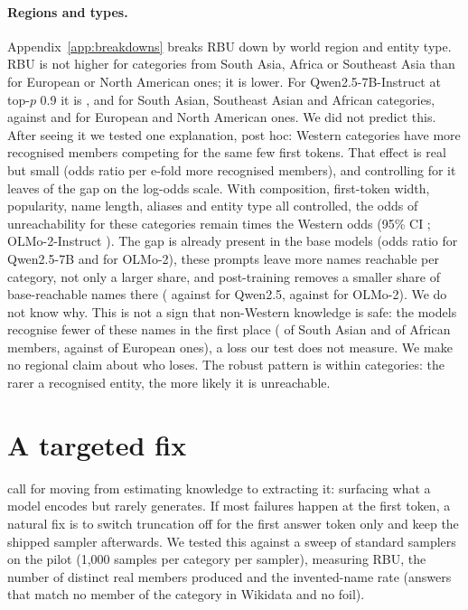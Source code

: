 \documentclass[11pt]{article}
\begin{document}
\paragraph{Regions and types.} Appendix~\ref{app:breakdowns} breaks RBU down by world region and entity type. RBU is not higher for categories from South Asia, Africa or Southeast Asia than for European or North American ones; it is lower. For Qwen2.5-7B-Instruct at top-$p$ 0.9 it is \rgRbuSouthAsia{}, \rgRbuSoutheastAsia{} and \rgRbuAfrica{} for South Asian, Southeast Asian and African categories, against \rgRbuEurope{} and \rgRbuNorthAmerica{} for European and North American ones. We did not predict this. After seeing it we tested one explanation, post hoc: Western categories have more recognised members competing for the same few first tokens. That effect is real but small (odds ratio \rgCompositionOR{} per e-fold more recognised members), and controlling for it leaves \rgCompositionShareLeft{} of the gap on the log-odds scale. With composition, first-token width, popularity, name length, aliases and entity type all controlled, the odds of unreachability for these categories remain \rgGapAdjQwen{} times the Western odds (95\% CI \rgGapAdjQwenCI{}; OLMo-2-Instruct \rgGapAdjOlmo{}). The gap is already present in the base models (odds ratio \rgGapRawQwenBase{} for Qwen2.5-7B and \rgGapRawOlmoBase{} for OLMo-2), these prompts leave more names reachable per category, not only a larger share, and post-training removes a smaller share of base-reachable names there (\rgLossSouthQwen{} against \rgLossWestQwen{} for Qwen2.5, \rgLossSouthOlmo{} against \rgLossWestOlmo{} for OLMo-2). We do not know why. This is not a sign that non-Western knowledge is safe: the models recognise fewer of these names in the first place (\rgRecRateSouthAsia{} of South Asian and \rgRecRateAfrica{} of African members, against \rgRecRateEurope{} of European ones), a loss our test does not measure. We make no regional claim about who loses. The robust pattern is within categories: the rarer a recognised entity, the more likely it is unreachable.

\section{A targeted fix}\label{sec:fix}

\citet{li2025unseen} call for moving from estimating knowledge to extracting it: surfacing what a model encodes but rarely generates. If most failures happen at the first token, a natural fix is to switch truncation off for the first answer token only and keep the shipped sampler afterwards. We tested this against a sweep of standard samplers on the pilot (1{,}000 samples per category per sampler), measuring RBU, the number of distinct real members produced and the invented-name rate (answers that match no member of the category in Wikidata and no foil).
\end{document}
